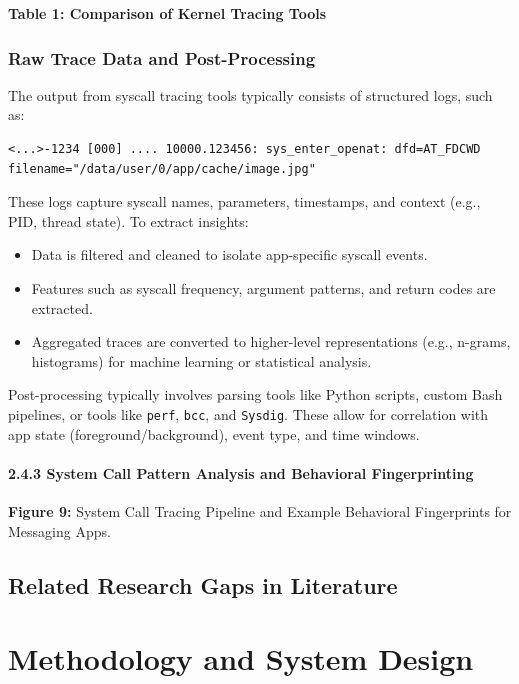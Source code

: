 \documentclass[a4paper,12pt]{report}
\begin{document}
\textbf{Table 1: Comparison of Kernel Tracing Tools}


\subsection{Raw Trace Data and Post-Processing}
The output from syscall tracing tools typically consists of structured logs, such as:

\begin{verbatim}
<...>-1234 [000] .... 10000.123456: sys_enter_openat: dfd=AT_FDCWD filename="/data/user/0/app/cache/image.jpg"
\end{verbatim}

These logs capture syscall names, parameters, timestamps, and context (e.g., PID, thread state). To extract insights:

\begin{itemize}
\item Data is filtered and cleaned to isolate app-specific syscall events.
\item Features such as syscall frequency, argument patterns, and return codes are extracted.
\item Aggregated traces are converted to higher-level representations (e.g., n-grams, histograms) for machine learning or statistical analysis.
\end{itemize}

Post-processing typically involves parsing tools like Python scripts, custom Bash pipelines, or tools like \texttt{perf}, \texttt{bcc}, and \texttt{Sysdig}. These allow for correlation with app state (foreground/background), event type, and time windows.

\subsubsection*{2.4.3 System Call Pattern Analysis and Behavioral Fingerprinting}

\textbf{Figure 9:} System Call Tracing Pipeline and Example Behavioral Fingerprints for Messaging Apps.


\section{Related Research  Gaps in Literature}

\chapter{Methodology and System Design}
\end{document}
